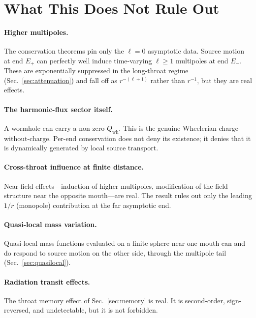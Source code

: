 \documentclass[aps,prd,onecolumn,nofootinbib,superscriptaddress]{revtex4-2}
\begin{document}
\section{What This Does Not Rule Out}
\label{sec:not-ruled-out}

\paragraph{Higher multipoles.}
The conservation theorems pin only the $\ell=0$ asymptotic data.  Source motion
at end $E_+$ can perfectly well induce time-varying $\ell\ge 1$ multipoles at
end $E_-$.  These are exponentially suppressed in the long-throat regime
(Sec.~\ref{sec:attenuation}) and fall off as $r^{-(\ell+1)}$ rather than
$r^{-1}$, but they are real effects.

\paragraph{The harmonic-flux sector itself.}
A wormhole can carry a non-zero $Q_{\mathrm{wh}}$.  This is the genuine
Wheelerian charge-without-charge.  Per-end conservation does not deny its
existence; it denies that it is dynamically generated by local source transport.

\paragraph{Cross-throat influence at finite distance.}
Near-field effects---induction of higher multipoles, modification of the field
structure near the opposite mouth---are real.  The result rules out only the
leading $1/r$ (monopole) contribution at the far asymptotic end.

\paragraph{Quasi-local mass variation.}
Quasi-local mass functions evaluated on a finite sphere near one mouth can and
do respond to source motion on the other side, through the multipole tail
(Sec.~\ref{sec:quasilocal}).

\paragraph{Radiation transit effects.}
The throat memory effect of Sec.~\ref{sec:memory} is real.  It is second-order,
sign-reversed, and undetectable, but it is not forbidden.
\end{document}
